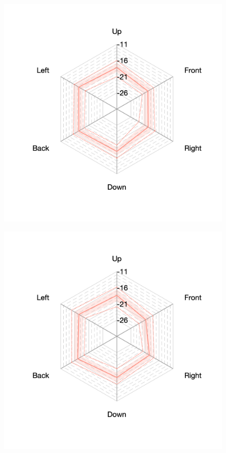 \documentclass[11pt,a4j]{jreport}
\begin{document}
    \begin{figure}[H]
      \begin{minipage}[b]{.33\textwidth}
          \centering
          \includegraphics[width=1\linewidth]{images/realHallDirSt/early_S03_allhall.png}
          \label{fig:S03early}
      \end{minipage}%
      \begin{minipage}[b]{.33\textwidth}
        \centering
        \includegraphics[width=1\linewidth]{images/realHallDirSt/early_S02_allhall.png}

\end{minipage}
\end{figure}
\end{document}
